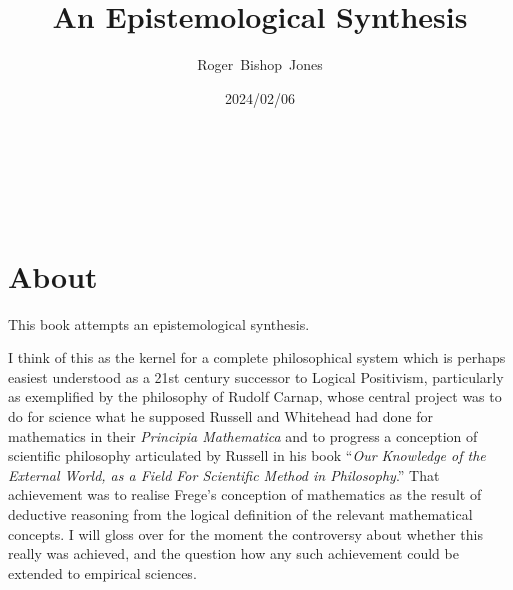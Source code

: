 \documentclass[10pt,titlepage]{book}
\title{\bf An Epistemological Synthesis}
\author{Roger~Bishop~Jones}
\date{\small 2024/02/06}
\newcommand{\ignore}[1]{}
\begin{document}
% 

                               
\begin{titlepage}
\maketitle





\end{titlepage}

\ \

\ignore{
\begin{centering}
{}
\end{centering}
}%

\setcounter{tocdepth}{2}
{\parskip-0pt\tableofcontents}


\hfill
\ 
\pagebreak







\section*{About}

This book attempts an epistemological synthesis.

I think of this as the kernel for a complete philosophical system which is perhaps easiest understood as a 21st century successor to Logical Positivism, particularly as exemplified by the philosophy of Rudolf Carnap, whose central project was to do for science what he supposed Russell and Whitehead had done for mathematics in their \emph{Principia Mathematica} \cite{russell1913} and to progress a conception of scientific philosophy articulated by Russell in his book ``\emph{Our Knowledge of the External World, as a Field For Scientific Method in Philosophy}.'' \cite{russell21}
That achievement was to realise Frege’s conception of mathematics as the result of deductive reasoning from the logical definition of the relevant mathematical concepts.  I will gloss over for the moment the controversy about whether this really was achieved, and the question how any such achievement could be extended to empirical sciences.
\end{document}
